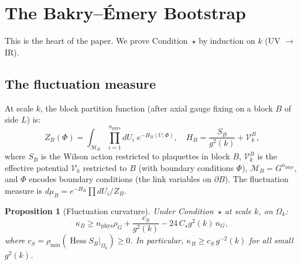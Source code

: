 \documentclass[11pt,a4paper]{article}
\theoremstyle{plain}
\newtheorem{proposition}[theorem]{Proposition}
\theoremstyle{definition}
\theoremstyle{remark}
\newcommand{\Hess}{\operatorname{Hess}}
\newcommand{\cM}{\mathcal{M}}
\newcommand{\cV}{\mathcal{V}}
\begin{document}
\section{The Bakry--\'Emery Bootstrap}\label{sec:bootstrap}

This is the heart of the paper. We prove Condition~$\star$
by induction on $k$ (UV $\to$ IR).

\subsection{The fluctuation measure}

At scale $k$, the block partition function
(after axial gauge fixing on a block $B$ of side $L$) is:
\begin{equation}\label{eq:block}
  Z_B(\Phi) = \int_{\cM_B} \prod_{i=1}^{n_{\mathrm{phys}}} dU_i\;
  e^{-H_B(U;\Phi)},
  \quad H_B = \frac{S_B}{g^2(k)} + \cV_k^B,
\end{equation}
where $S_B$ is the Wilson action restricted to plaquettes
in block $B$, $\cV_k^B$ is the effective potential
$\cV_k$ restricted to $B$ (with boundary conditions $\Phi$),
$\cM_B = G^{n_{\mathrm{phys}}}$, and $\Phi$ encodes
boundary conditions (the link variables on $\partial B$).
The fluctuation measure is
$d\mu_B = e^{-H_B}\prod dU_i / Z_B$.

\begin{proposition}[Fluctuation curvature]
\label{prop:fluct_curv}
Under Condition~$\star$ at scale $k$, on $\Omega_k$:
\begin{equation}\label{eq:kappa_B}
  \kappa_B \ge n_{\mathrm{phys}}\rho_G
  + \frac{c_S}{g^2(k)} - 24\,C_\star g^2(k)\,n_G,
\end{equation}
where $c_S = \rho_{\min}(\Hess S_B|_{\Omega_k}) \ge 0$.
In particular, $\kappa_B \ge c_S\,g^{-2}(k)$ for all
small $g^2(k)$.
\end{proposition}
\end{document}
